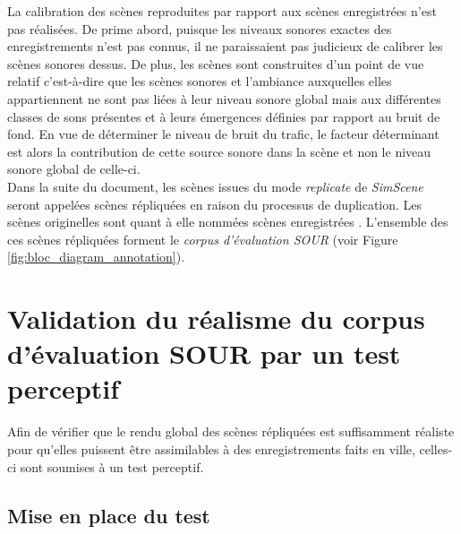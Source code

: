 La calibration des scènes reproduites par rapport aux scènes enregistrées n'est pas réalisées. De prime abord, puisque les niveaux sonores exactes des enregistrements n'est pas connus, il ne paraissaient pas judicieux de calibrer les scènes sonores dessus. De plus, les scènes sont construites d'un point de vue relatif c'est-à-dire que les scènes sonores et l'ambiance auxquelles elles appartiennent ne sont pas liées à leur niveau sonore global mais aux différentes classes de sons présentes et à leurs émergences définies par rapport au bruit de fond. En vue de déterminer le niveau de bruit du trafic, le facteur déterminant est alors la contribution de cette source sonore dans la scène et non le niveau sonore global de celle-ci.\\

Dans la suite du document, les scènes issues du mode \textit{replicate} de \textit{SimScene} seront appelées \og scènes répliquées \fg{} en raison du processus de duplication. Les scènes originelles sont quant à elle nommées \og scènes enregistrées \fg{}. L'ensemble des ces scènes répliquées forment le \textit{corpus d'évaluation SOUR} (voir Figure \ref{fig:bloc_diagram_annotation}).\\


\section{Validation du réalisme du corpus d'évaluation SOUR par un test perceptif}\label{sec:test}

Afin de vérifier que le rendu global des scènes répliquées est suffisamment réaliste pour qu'elles puissent être assimilables à des enregistrements faits en ville, celles-ci sont soumises à un test perceptif.

\subsection{Mise en place du test}

